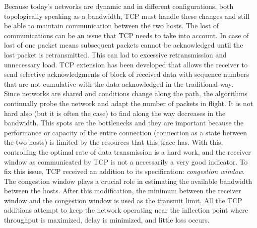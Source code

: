 Because today's networks are dynamic and in different configurations, both
topologically speaking as a  bandwidth, TCP must handle these changes and
still be able to maintain communication between the two hosts. The lost of
communications can be an issue that TCP needs to take into account. In case of
lost of one packet means subsequent packets cannot be acknowledged until the
lost packet is retransmitted. This can lad to excessive retransmission and
unnecessary load. TCP extension has been developed that allows the receiver to
send selective acknowledgments of block of received data with sequence numbers
that are not cumulative with the data acknowledged in the traditional
way\cite{RFC2018}.\\

Since networks are shared and conditions change along the path, the algorithms
continually probe the network and adapt the number of packets in flight. It is
not hard also (but it is often the case) to find along the way decreases in
the bandwidth. This spots are the bottlenecks and they are important because
the performance or capacity of the entire connection (connection as a state
between the two hosts) is limited by the resources that this trace has. With
this, controlling the optimal rate of data transmission is a hard work, and
the receiver window as communicated by TCP is not a necessarily a very good
indicator. To fix this issue, TCP received an addition to its specification:
\textit{congestion window}. The congestion window plays a crucial role in
estimating the available bandwidth between the hosts. After this modification,
the minimum between the receiver window and the congestion window is used as
the transmit limit. All the TCP additions attempt to keep the network
operating near the inflection point where throughput is maximized, delay is
minimized, and little loss occurs.\\

